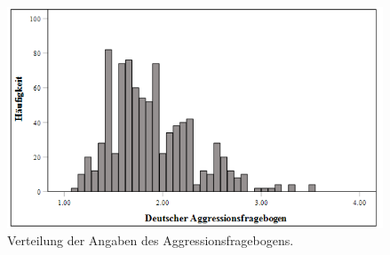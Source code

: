 \begin{figure}[htb]
    \centering
        \includegraphics[width=0.8\linewidth]{Histogramm - AggroFB.png}
        \caption[Histogramm Altersverteilung]{Verteilung der Angaben des Aggressionsfragebogens.}
        \label{Histogramm AggroFB}
\end{figure}

